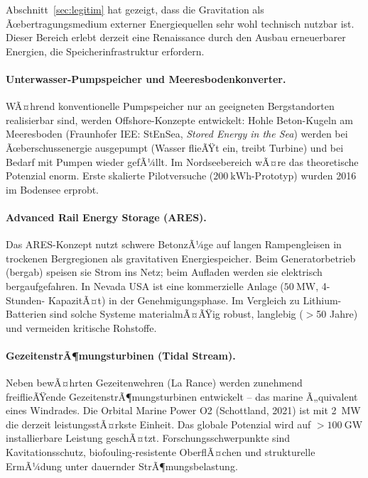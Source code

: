 ﻿\documentclass[12pt, a4paper]{report}
\theoremstyle{definition}
\theoremstyle{remark}
\begin{document}
Abschnitt~\ref{sec:legitim} hat gezeigt, dass die Gravitation als
Ãœbertragungsmedium externer Energiequellen sehr wohl technisch nutzbar ist.
Dieser Bereich erlebt derzeit eine Renaissance durch den Ausbau erneuerbarer
Energien, die Speicherinfrastruktur erfordern.

\paragraph{Unterwasser-Pumpspeicher und Meeresbodenkonverter.}
WÃ¤hrend konventionelle Pumpspeicher nur an geeigneten Bergstandorten realisierbar
sind, werden Offshore-Konzepte entwickelt: Hohle Beton-Kugeln am Meeresboden
(Fraunhofer IEE: StEnSea, \emph{Stored Energy in the Sea}) werden bei
Ãœberschussenergie ausgepumpt (Wasser flieÃŸt ein, treibt Turbine) und bei Bedarf
mit Pumpen wieder gefÃ¼llt. Im Nordseebereich wÃ¤re das theoretische Potenzial
enorm. Erste skalierte Pilotversuche ($\SI{200}{\kilo\watt\hour}$-Prototyp) wurden
2016 im Bodensee erprobt.

\paragraph{Advanced Rail Energy Storage (ARES).}
Das ARES-Konzept nutzt schwere BetonzÃ¼ge auf langen Rampengleisen in trockenen
Bergregionen als gravitativen Energiespeicher. Beim Generatorbetrieb (bergab)
speisen sie Strom ins Netz; beim Aufladen werden sie elektrisch bergaufgefahren.
In Nevada USA ist eine kommerzielle Anlage ($\SI{50}{\mega\watt}$, 4-Stunden-
KapazitÃ¤t) in der Genehmigungsphase. Im Vergleich zu Lithium-Batterien sind
solche Systeme materialmÃ¤ÃŸig robust, langlebig ($>$50 Jahre) und vermeiden
kritische Rohstoffe.

\paragraph{GezeitenstrÃ¶mungsturbinen (Tidal Stream).}
Neben bewÃ¤hrten Gezeitenwehren (La Rance) werden zunehmend freiflieÃŸende
GezeitenstrÃ¶mungsturbinen entwickelt -- das marine Ã„quivalent eines Windrades.
Die Orbital Marine Power O2 (Schottland, 2021) ist mit \SI{2}{\mega\watt}
die derzeit leistungsstÃ¤rkste Einheit. Das globale Potenzial wird auf
$>\SI{100}{\giga\watt}$ installierbare Leistung geschÃ¤tzt. Forschungsschwerpunkte
sind Kavitationsschutz, biofouling-resistente OberflÃ¤chen und strukturelle
ErmÃ¼dung unter dauernder StrÃ¶mungsbelastung.
\end{document}
